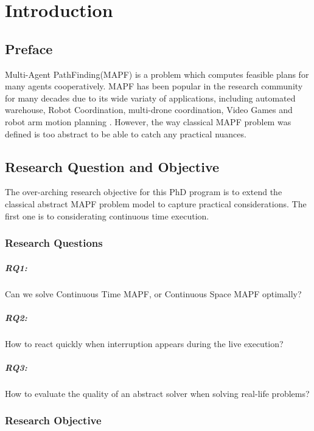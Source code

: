 \chapter{Introduction}
\section{Preface}
Multi-Agent PathFinding(MAPF) is a problem which computes feasible plans for many agents cooperatively.
MAPF has been popular in the research community for many decades due to its wide variaty of applications, including automated warehouse\cite{warehouse1_2008,warehouse2_2020,warehouse3_2017}, Robot Coordination\cite{robot_2016}, multi-drone coordination\cite{drone_2022}, Video Games\cite{vidGame_2022} and robot arm motion planning \cite{motion_planning_2021}.
However, the way classical MAPF problem was defined is too abstract to be able to catch any practical nuances.

\section{Research Question and Objective}
The over-arching research objective for this PhD program is to extend the classical abstract MAPF problem model to capture practical considerations.
The first one is to considerating continuous time execution.

\subsection{Research Questions}
\paragraph*{RQ1:} Can we solve Continuous Time MAPF, or Continuous Space MAPF optimally?
\paragraph*{RQ2:} How to react quickly when interruption appears during the live execution?
\paragraph*{RQ3:} How to evaluate the quality of an abstract solver when solving real-life problems?

\subsection{Research Objective}
